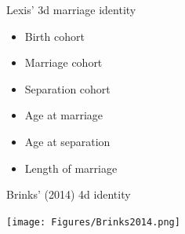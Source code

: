 \documentclass[20pt]{beamer}
\begin{document}
\begin{frame}[plain]
\Large
\begin{center}
Lexis' 3d marriage identity
\vspace{1em}
\begin{itemize}
  \item Birth cohort
  \item Marriage cohort
  \item Separation cohort
  \item Age at marriage
  \item Age at separation
  \item Length of marriage
\end{itemize}
\end{center}
\end{frame}




\begin{frame}[plain]
\Large
\begin{center}
Brinks' (2014) 4d identity

\vspace{2em}
\texttt{[image: Figures/Brinks2014.png]}
\end{center}
\end{frame}

\end{document}
